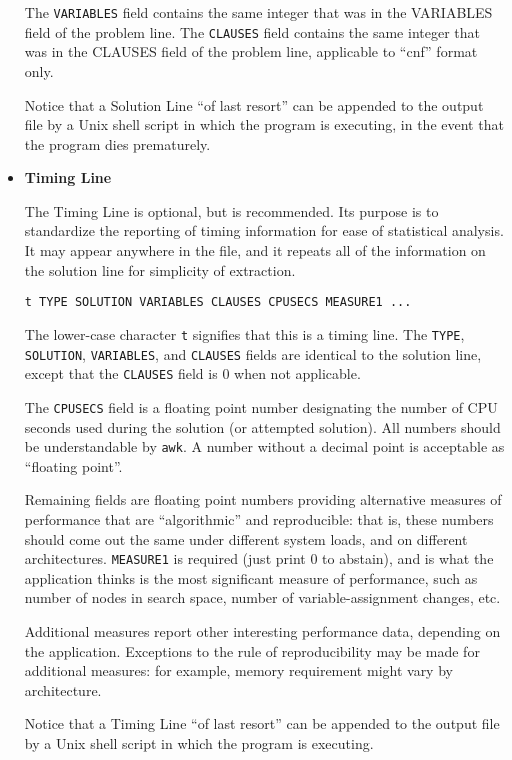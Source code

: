 \begin{itemize}
The {\tt VARIABLES} field contains the same integer that was in
the VARIABLES field of the problem line.
The {\tt CLAUSES} field contains the same integer that was in
the CLAUSES field of the problem line, applicable to ``cnf'' format only.

Notice that a Solution Line ``of last resort'' can be appended to
the output file by a Unix shell script in which the program is executing,
in the event that the program dies prematurely.

\item {\bf Timing Line}

The Timing Line is optional, but is recommended.
Its purpose is to standardize the reporting of timing information
for ease of statistical analysis.
It may appear anywhere in the file, and it repeats all
of the information on the solution line for simplicity of extraction.
\begin{verbatim}
t TYPE SOLUTION VARIABLES CLAUSES CPUSECS MEASURE1 ...
\end{verbatim}
The lower-case character {\tt t} signifies that this is a timing
line. The {\tt TYPE}, {\tt SOLUTION}, {\tt VARIABLES},
and {\tt CLAUSES} fields are identical to the solution line, except
that the {\tt CLAUSES} field is 0 when not applicable.

The {\tt CPUSECS} field is a floating point number designating
the number of CPU seconds used during the solution (or attempted
solution).  All numbers should be understandable by {\tt awk}.
A number without a decimal point is acceptable as ``floating point''.

Remaining fields are floating point numbers providing alternative
measures of performance that are ``algorithmic'' and reproducible:
that is, these numbers should come out the same under different
system loads, and on different architectures.
{\tt MEASURE1} is required (just print 0 to abstain), and is what
the application thinks is the most significant measure of
performance, such as number of nodes in search space, number of
variable-assignment changes, etc.

Additional measures report other interesting performance data,
depending on the application.
Exceptions to the rule of reproducibility may be made for additional
measures: for example, memory requirement might vary by architecture.

Notice that a Timing Line ``of last resort'' can be appended to
the output file by a Unix shell script in which the program is executing.



\end{itemize}
